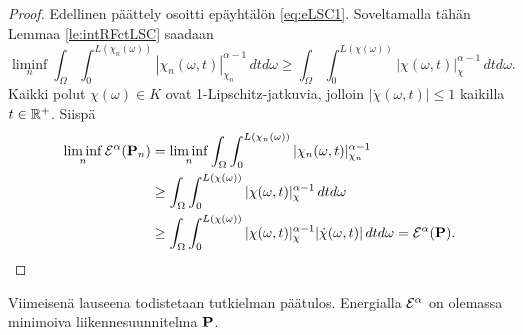 \documentclass[12pt,oneside,a4paper]{amsbook} %
\begin{document}
\begin{proof}
    Edellinen päättely osoitti epäyhtälön \eqref{eq:eLSC1}. Soveltamalla tähän Lemmaa \ref{le:intRFctLSC} saadaan
    \begin{equation*}
        \liminf_n \int_\Omega \int_0^{L(\chi_n(\omega))}|\chi_n(\omega, t)|_{\chi_n}^{\alpha-1} \, dtd\omega \ge \int_\Omega \int_0^{L(\chi(\omega))}|\chi(\omega, t)|_{\chi}^{\alpha-1} \, dtd\omega.
    \end{equation*}
    Kaikki polut  $\chi(\omega) \in K$ ovat 1-Lipschitz-jatkuvia, jolloin $|\dot \chi(\omega, t)| \le 1$ kaikilla $t \in \R^+$. Siispä
    \begin{align*}
         \liminf_n \E^\alpha(\P_n) &=  \liminf_n \int_\Omega \int_0^{L(\chi_n(\omega))}|\chi_n(\omega, t)|_{\chi_n}^{\alpha-1} \\
         &\ge \int_\Omega\int_0^{L(\chi(\omega))}|\chi(\omega, t)|_{\chi}^{\alpha-1} \, dtd\omega \\
         &\ge \int_\Omega\int_0^{L(\chi(\omega))}|\chi(\omega, t)|_{\chi}^{\alpha-1}|\dot \chi(\omega, t)| \, dtd\omega = \E^\alpha(\P).
    \end{align*}
\end{proof}

Viimeisenä lauseena todistetaan tutkielman päätulos. Energialla $\E^\alpha$ on olemassa minimoiva liikennesuunnitelma $\P$.
\end{document}
